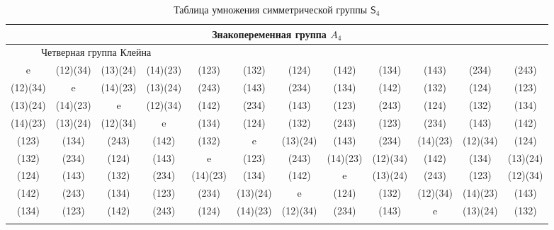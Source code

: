 \documentclass[11pt]{book}
\theoremstyle{mythm}
\theoremstyle{mydef}
\numberwithin{upr}{chapter}
\newcommand{\Sb}{{\mathsf{S}}}
\begin{document}
\newpage\renewcommand{\arraystretch}{1.8}\renewcommand{\tabcolsep}{1mm}
\begin{table}[h!]\tiny\sffamily %
\caption{Таблица умножения симметрической группы $\Sb_4$}
\label{SymmetricS4}
\begin{tabular}{c|ccccccccccc}
\hline
\multicolumn{12}{c}{\normalsize\cellcolor{lightGreen} Знакопеременная группа $A_4$} \\ \hline
\multicolumn{4}{c|}{\normalsize\cellcolor{lightYellow} Четверная группа Клейна} & & & & & & & & \\ \hline\rowcolor{lightGreen}
\cellcolor{lightYellow}e & \cellcolor{yellow}(12)(34) &\cellcolor{yellow} (13)(24) &\multicolumn{1}{c|}{\cellcolor{yellow} (14)(23)} & (123) & (132) & (124) & (142) & (134) & (143) & (234) & (243) \\ \hline\rowcolor{lightGreen}
\cellcolor{yellow}(12)(34) &\cellcolor{lightYellow} e &\cellcolor{lightYellow} (14)(23) &\multicolumn{1}{c|}{\cellcolor{lightYellow} (13)(24)} & (243) & (143) & (234) & (134) & (142) & (132) & (124) & (123) \\ \hline\rowcolor{lightGreen}
\cellcolor{yellow}(13)(24) &\cellcolor{lightYellow} (14)(23) &\cellcolor{lightYellow} e &\multicolumn{1}{c|}{\cellcolor{lightYellow} (12)(34)} & (142) & (234) & (143) & (123) & (243) & (124) & (132) & (134) \\ \hline\rowcolor{lightGreen}
\cellcolor{yellow}(14)(23) &\cellcolor{lightYellow} (13)(24) &\cellcolor{lightYellow} (12)(34) &\multicolumn{1}{c|}{\cellcolor{lightYellow} e} & (134) & (124) & (132) & (243) & (123) & (234) & (143) & (142) \\ \hline\rowcolor{lightGreen}
(123) & (134) & (243) & (142) & \cellcolor{lightBlue}(132) & \cellcolor{lightBlue}e & (13)(24) & (143) & (234) & (14)(23) & (12)(34) & (124) \\ \hline\rowcolor{lightGreen}
(132) & (234) & (124) & (143) & \cellcolor{lightBlue}e & \cellcolor{lightBlue}(123) & (243) & (14)(23) & (12)(34) & (142) & (134) & (13)(24) \\ \hline\rowcolor{lightGreen}
(124) & (143) & (132) & (234) & (14)(23) & (134) & \cellcolor{lightBlue}(142) & \cellcolor{lightBlue}e & (13)(24) & (243) & (123) & (12)(34) \\ \hline\rowcolor{lightGreen}
(142) & (243) & (134) & (123) & (234) & (13)(24) & \cellcolor{lightBlue}e & \cellcolor{lightBlue}(124) & (132) & (12)(34) & (14)(23) & (143) \\ \hline\rowcolor{lightGreen}
(134) & (123) & (142) & (243) & (124) & (14)(23) & (12)(34) & (234) & \cellcolor{lightBlue}(143) & \cellcolor{lightBlue}e & (13)(24) & (132) \\ \hline\rowcolor{lightGreen}

\end{tabular}
\end{table}
\end{document}
